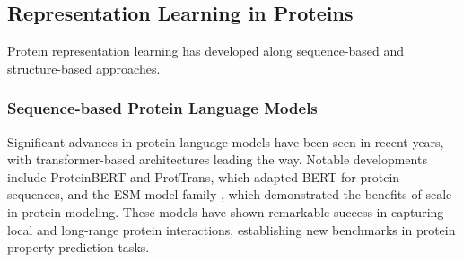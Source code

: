 


\subsection{Representation Learning in Proteins}
Protein representation learning has developed along sequence-based and structure-based approaches.

\subsubsection{Sequence-based Protein Language Models}
Significant advances in protein language models have been seen in recent years, with transformer-based architectures\cite{Vaswani2017} leading the way. Notable developments include ProteinBERT \cite{brandes2021proteinbert} and ProtTrans\cite{elnaggar2021prottrans}, which adapted BERT\cite{devlin2018bert} for protein sequences, and the ESM model family \cite{hayes2024simulating, lin2023evolutionary, rives2021biological}, which demonstrated the benefits of scale in protein modeling. These models have shown remarkable success in capturing local and long-range protein interactions, establishing new benchmarks in protein property prediction tasks.


